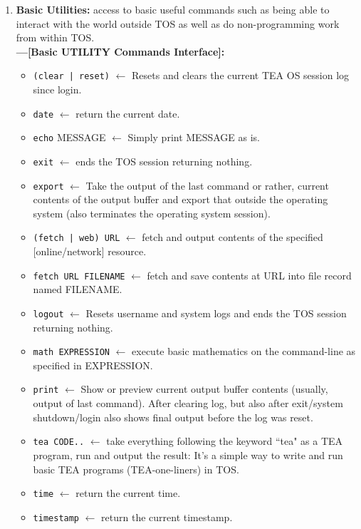 \documentclass[a4paper, 18pt]{book} %
\begin{document}
{{{\begin{enumerate}
\item {  \textbf{Basic Utilities:} access to basic useful commands such as being able to interact with the world outside TOS as well as do non-programming work from within TOS.\\
\textbf{---[Basic UTILITY Commands Interface]:}
\begin{itemize}
\item \texttt{(clear | reset)} $\leftarrow$ Resets and clears the current TEA OS session log since login.
\item \texttt{date} $\leftarrow$ return the current date.
\item \texttt{echo} MESSAGE $\leftarrow$ Simply print MESSAGE as is.
\item \texttt{exit} $\leftarrow$ ends the TOS session returning nothing.
\item \texttt{export} $\leftarrow$ Take the output of the last command or rather, current contents of the output buffer and export that outside the operating system (also terminates the operating system session).

\item \texttt{(fetch | web) URL} $\leftarrow$ fetch and output contents of the specified [online/network] resource.
\item \texttt{fetch URL FILENAME} $\leftarrow$ fetch and save contents at URL into file record named FILENAME.

\item \texttt{logout} $\leftarrow$ Resets username and system logs and ends the TOS session returning nothing.

\item \texttt{math EXPRESSION} $\leftarrow$ execute basic mathematics on the command-line as specified in EXPRESSION.

\item \texttt{print} $\leftarrow$ Show or preview current output buffer contents (usually, output of last command). After clearing log, but also after exit/system shutdown/login also shows final output before the log was reset.

\item \texttt{tea CODE..} $\leftarrow$ take everything following the keyword ``tea" as a TEA program, run and output the result: It's a simple way to write and run basic TEA programs (TEA-one-liners) in TOS.

\item \texttt{time} $\leftarrow$ return the current time.
\item \texttt{timestamp} $\leftarrow$ return the current timestamp.



\end{itemize}}
\end{enumerate}}}}
\end{document}
